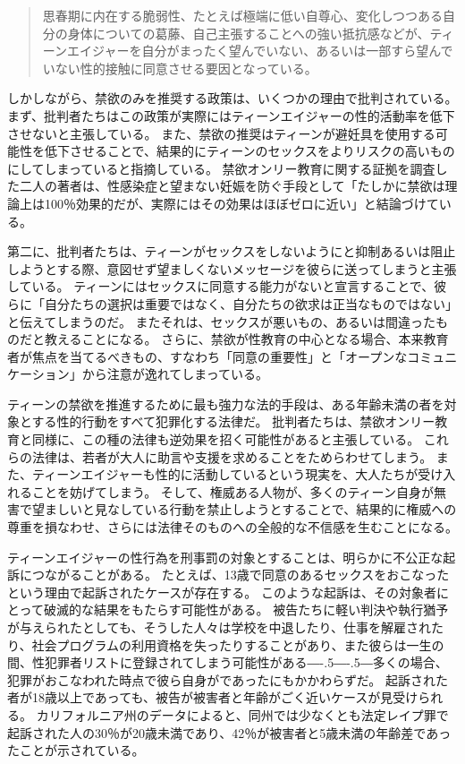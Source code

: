 \documentclass[paper=a4,book,openany]{jlreq}
\def\DDASH{―\kern-.5\zw―\kern-.5\zw―} %
\begin{document}
\begin{quote}
思春期に内在する脆弱性、たとえば極端に低い自尊心、変化しつつある自分の身体についての葛藤、自己主張することへの強い抵抗感などが、ティーンエイジャーを自分がまったく望んでいない、あるいは一部すら望んでいない性的接触に同意させる要因となっている。
\citep[p.709]{oberman01:_girls_master_house}
\end{quote}

しかしながら、禁欲のみを推奨する政策は、いくつかの理由で批判されている。
まず、批判者たちはこの政策が実際にはティーンエイジャーの性的活動率を低下させないと主張している。
また、禁欲の推奨はティーンが避妊具を使用する可能性を低下させることで、結果的にティーンのセックスをよりリスクの高いものにしてしまっていると指摘している。
禁欲オンリー教育に関する証拠を調査した二人の著者は、性感染症と望まない妊娠を防ぐ手段として「たしかに禁欲は理論上は100％効果的だが、実際にはその効果はほぼゼロに近い」と結論づけている\citep{santelli06:_abstin_abstin_only_educat}。

第二に、批判者たちは、ティーンがセックスをしないようにと抑制あるいは阻止しようとする際、意図せず望ましくないメッセージを彼らに送ってしまうと主張している。
ティーンにはセックスに同意する能力がないと宣言することで、彼らに「自分たちの選択は重要ではなく、自分たちの欲求は正当なものではない」と伝えてしまうのだ。
またそれは、セックスが悪いもの、あるいは間違ったものだと教えることになる。
さらに、禁欲が性教育の中心となる場合、本来教育者が焦点を当てるべきもの、すなわち「同意の重要性」と「オープンなコミュニケーション」から注意が逸れてしまっている。

ティーンの禁欲を推進するために最も強力な法的手段は、ある年齢未満の者を対象とする性的行動をすべて犯罪化する法律だ。
批判者たちは、禁欲オンリー教育と同様に、この種の法律も逆効果を招く可能性があると主張している。
これらの法律は、若者が大人に助言や支援を求めることをためらわせてしまう。
また、ティーンエイジャーも性的に活動しているという現実を、大人たちが受け入れることを妨げてしまう。
そして、権威ある人物が、多くのティーン自身が無害で望ましいと見なしている行動を禁止しようとすることで、結果的に権威への尊重を損なわせ、さらには法律そのものへの全般的な不信感を生むことになる。

ティーンエイジャーの性行為を刑事罰の対象とすることは、明らかに不公正な起訴につながることがある。
たとえば、13歳で同意のあるセックスをおこなったという理由で起訴されたケースが存在する。
このような起訴は、その対象者にとって破滅的な結果をもたらす可能性がある。
被告たちに軽い判決や執行猶予が与えられたとしても、そうした人々は学校を中退したり、仕事を解雇されたり、社会プログラムの利用資格を失ったりすることがあり、また彼らは一生の間、性犯罪者リストに登録されてしまう可能性がある{\DDASH}多くの場合、犯罪がおこなわれた時点で彼ら自身がであったにもかかわらずだ。
起訴された者が18歳以上であっても、被告が被害者と年齢がごく近いケースが見受けられる。
カリフォルニア州のデータによると、同州では少なくとも法定レイプ罪で起訴された人の30％が20歳未満であり、42％が被害者と5歳未満の年齢差であったことが示されている\citep[pp.51--52]{ccasa2008}。
\end{document}
